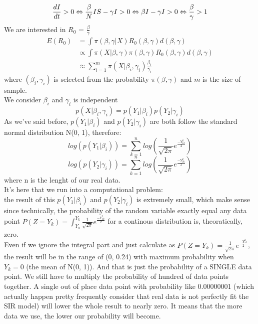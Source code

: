 \documentclass[a4paper]{article}
\begin{document}
    \begin{equation*}
        \frac{dI}{dt} > 0 \Leftrightarrow \frac{\beta}{N}IS - \gamma I > 0 \\
        \Leftrightarrow \beta I - \gamma I > 0 \Leftrightarrow \frac{\beta}{\gamma} > 1
    \end{equation*}
    We are interested in $R_0$ = $\frac{\beta}{\gamma}$
    \begin{equation*}
    \begin{split}
        E(R_0) &= \int \pi (\beta, \gamma | X) R_0 (\beta,\gamma) d(\beta,\gamma) \\
         &\propto \int \pi (X | \beta ,\gamma) \pi (\beta, \gamma) R_0(\beta, \gamma) d(\beta , \gamma) \\
         &\approx \sum_{i=1}^m \pi (X | \beta_i ,\gamma_i) \frac{\beta_i}{\gamma_i}
    \end{split}
    \end{equation*}
    where $(\beta_i ,\gamma_i)$ is selected  from the probability $\pi (\beta,\gamma)$ and $m$ is the size of sample. \\
    We consider  $\beta_i$ and $\gamma_i$  is independent
    \begin{equation}
        p(X|\beta_i ,\gamma_i) = p(Y_1|\beta_i ) p(Y_2|\gamma_i )
    \end{equation}
    As we've said before, $p(Y_1|\beta_i)$ and $p(Y_2|\gamma_i)$ are both follow the standard normal distribution N(0, 1), therefore:\\
    $$log(p(Y_1|\beta_i)) = \sum_{k=1}^n log(\frac{1}{\sqrt{2\pi}} e^{\frac{-Y^2_{1k}}{2}})$$
    $$log(p(Y_2|\gamma_i)) = \sum_{k=1}^n log(\frac{1}{\sqrt{2\pi}} e^{\frac{-Y^2_{2k}}{2}})$$
    where n is the lenght of our real data.\\
    It's here that we run into a computational problem: \\
    the result of this $p(Y_1|\beta_i)$ and $p(Y_2|\gamma_i)$ is extremely small, which make sense since technically, the probability of the random variable exactly equal any data point $P(Z = Y_{k}) = \int_{Y_{k}}^{Y_{k}} \frac{1}{\sqrt{2\pi}} e^{\frac{-Y^2_{1k}}{2}}$ for a continous distribution is, theoratically, zero.\\
    Even if we ignore the integral part and just calculate as $P(Z = Y_{k}) = \frac{1}{\sqrt{2\pi}} e^{\frac{-Y^2_{1k}}{2}}$, the result will be in the range of (0, 0.24) with maximum probability when $Y_k = 0$ (the mean of N(0, 1)). And that is just the probability of a SINGLE data point. We still have to multiply the probability of hundred of data points together. A single out of place data point with probability like 0.00000001 (which actually happen pretty frequently consider that real data is not perfectly fit the SIR model) will lower the whole result to nearly zero. It means that the more data we use, the lower our probability will become.\\
\end{document}
